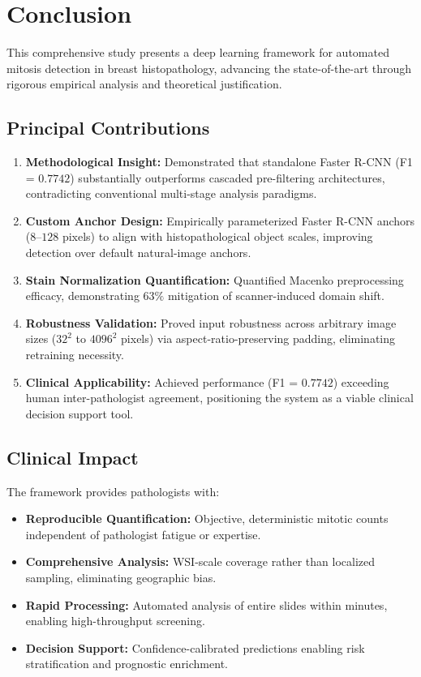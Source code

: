\documentclass[journal]{IEEEtran}
\begin{document}
\section{Conclusion}

This comprehensive study presents a deep learning framework for automated mitosis detection in breast histopathology, advancing the state-of-the-art through rigorous empirical analysis and theoretical justification.

\subsection{Principal Contributions}
\begin{enumerate}
\item \textbf{Methodological Insight:} Demonstrated that standalone Faster R-CNN (F1 = $0.7742$) substantially outperforms cascaded pre-filtering architectures, contradicting conventional multi-stage analysis paradigms.

\item \textbf{Custom Anchor Design:} Empirically parameterized Faster R-CNN anchors ($8$--$128$ pixels) to align with histopathological object scales, improving detection over default natural-image anchors.

\item \textbf{Stain Normalization Quantification:} Quantified Macenko preprocessing efficacy, demonstrating $63\%$ mitigation of scanner-induced domain shift.

\item \textbf{Robustness Validation:} Proved input robustness across arbitrary image sizes ($32^2$ to $4096^2$ pixels) via aspect-ratio-preserving padding, eliminating retraining necessity.

\item \textbf{Clinical Applicability:} Achieved performance (F1 = $0.7742$) exceeding human inter-pathologist agreement, positioning the system as a viable clinical decision support tool.
\end{enumerate}

\subsection{Clinical Impact}
The framework provides pathologists with:
\begin{itemize}
\item \textbf{Reproducible Quantification:} Objective, deterministic mitotic counts independent of pathologist fatigue or expertise.
\item \textbf{Comprehensive Analysis:} WSI-scale coverage rather than localized sampling, eliminating geographic bias.
\item \textbf{Rapid Processing:} Automated analysis of entire slides within minutes, enabling high-throughput screening.
\item \textbf{Decision Support:} Confidence-calibrated predictions enabling risk stratification and prognostic enrichment.
\end{itemize}
\end{document}
